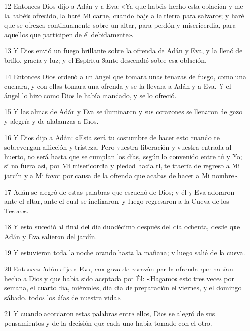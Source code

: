 \par 12 Entonces Dios dijo a Adán y a Eva: «Ya que habéis hecho esta oblación y me la habéis ofrecido, la haré Mi carne, cuando baje a la tierra para salvaros; y haré que se ofrezca continuamente sobre un altar, para perdón y misericordia, para aquellos que participen de él debidamente».

\par 13 Y Dios envió un fuego brillante sobre la ofrenda de Adán y Eva, y la llenó de brillo, gracia y luz; y el Espíritu Santo descendió sobre esa oblación.

\par 14 Entonces Dios ordenó a un ángel que tomara unas tenazas de fuego, como una cuchara, y con ellas tomara una ofrenda y se la llevara a Adán y a Eva. Y el ángel lo hizo como Dios le había mandado, y se lo ofreció.

\par 15 Y las almas de Adán y Eva se iluminaron y sus corazones se llenaron de gozo y alegría y de alabanzas a Dios.

\par 16 Y Dios dijo a Adán: «Esta será tu costumbre de hacer esto cuando te sobrevengan aflicción y tristeza. Pero vuestra liberación y vuestra entrada al huerto, no será hasta que se cumplan los días, según lo convenido entre tú y Yo; si no fuera así, por Mi misericordia y piedad hacia ti, te traería de regreso a Mi jardín y a Mi favor por causa de la ofrenda que acabas de hacer a Mi nombre».

\par 17 Adán se alegró de estas palabras que escuchó de Dios; y él y Eva adoraron ante el altar, ante el cual se inclinaron, y luego regresaron a la Cueva de los Tesoros.

\par 18 Y esto sucedió al final del día duodécimo después del día ochenta, desde que Adán y Eva salieron del jardín.

\par 19 Y estuvieron toda la noche orando hasta la mañana; y luego salió de la cueva.

\par 20 Entonces Adán dijo a Eva, con gozo de corazón por la ofrenda que habían hecho a Dios y que había sido aceptada por Él: «Hagamos esto tres veces por semana, el cuarto día, miércoles, día día de preparación el viernes, y el domingo sábado, todos los días de nuestra vida».

\par 21 Y cuando acordaron estas palabras entre ellos, Dios se alegró de sus pensamientos y de la decisión que cada uno había tomado con el otro.

